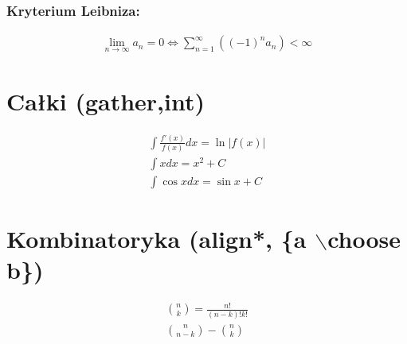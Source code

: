 \documentclass[12pt]{article}
\begin{document}
    \subsubsection{Kryterium Leibniza:} 
    
    \begin{align}
      \lim\limits_{n \rightarrow \infty} a_{n} = 0 \iff \sum\limits_{n=1}^{\infty} \left( \left(-1\right)^{n} a_{n}\right) < \infty
    \end{align}

\section{Całki (gather,int)}
\begin{gather} %
  \int\frac{f'(x)}{f(x)}dx = \ln\left|f(x)\right|	\\
  \int xdx = x^{2} + C \\
\int \cos xdx = \sin x + C
\end{gather}

\section{Kombinatoryka (align*, \{a $\backslash$choose b\})} 
\begin{align*} %
{n \choose k} = \frac{n!}{(n-k)!k!}\\
{n \choose n-k} - {n \choose k}
\end{align*}

\tableofcontents %
\end{document}

